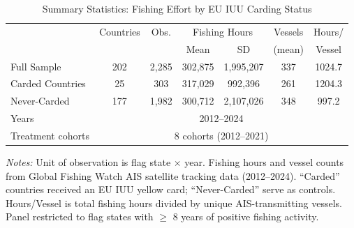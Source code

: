 \begin{table}[t]
\centering
\caption{Summary Statistics: Fishing Effort by EU IUU Carding Status}
\label{tab:sumstats}
\begin{threeparttable}
\begin{tabular}{lcccccc}
\toprule
 & Countries & Obs. & \multicolumn{2}{c}{Fishing Hours} & Vessels & Hours/ \\
 & & & Mean & SD & (mean) & Vessel \\
\midrule
Full Sample & 202 & 2,285 & 302,875 & 1,995,207 & 337 & 1024.7 \\
Carded Countries & 25 & 303 & 317,029 & 992,396 & 261 & 1204.3 \\
Never-Carded & 177 & 1,982 & 300,712 & 2,107,026 & 348 & 997.2 \\
\midrule
Years & \multicolumn{6}{c}{2012--2024} \\
Treatment cohorts & \multicolumn{6}{c}{8 cohorts (2012--2021)} \\
\bottomrule
\end{tabular}
\begin{tablenotes}[flushleft]
\small
\item \textit{Notes:} Unit of observation is flag state $\times$ year. Fishing hours and vessel counts from Global Fishing Watch AIS satellite tracking data (2012--2024). ``Carded'' countries received an EU IUU yellow card; ``Never-Carded'' serve as controls. Hours/Vessel is total fishing hours divided by unique AIS-transmitting vessels. Panel restricted to flag states with $\geq$ 8 years of positive fishing activity.
\end{tablenotes}
\end{threeparttable}
\end{table}
